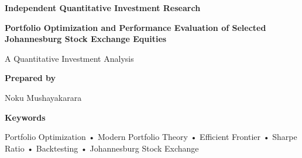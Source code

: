 \begin{titlepage}

\centering

\vspace*{2cm}

{\Large \textbf{Independent Quantitative Investment Research}}

\vspace{1.5cm}

{\Huge \textbf{Portfolio Optimization and Performance Evaluation of Selected Johannesburg Stock Exchange Equities}}

\vspace{0.5cm}

{\Large A Quantitative Investment Analysis}

\vfill

\textbf{Prepared by}

\vspace{0.5cm}

{\Large Noku Mushayakarara}

\vspace{0.4cm}


\vfill





\vfill  

\textbf{Keywords}

Portfolio Optimization • Modern Portfolio Theory • Efficient Frontier • Sharpe Ratio • Backtesting • Johannesburg Stock Exchange

\end{titlepage}

\clearpage